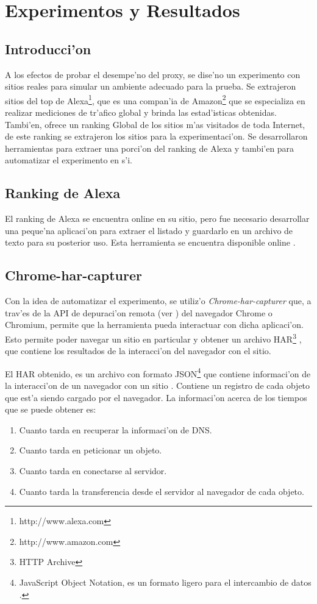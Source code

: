 \chapter{Experimentos y Resultados}
\label{experimentacion}
\section{Introducci'on}

A los efectos de probar el desempe'no del proxy, se dise'no un experimento con sitios reales para simular un ambiente adecuado para la prueba. Se extrajeron sitios del top de Alexa\footnote{http://www.alexa.com}, que es una compan'ia de Amazon\footnote{http://www.amazon.com} que se especializa en realizar mediciones de tr'afico global y brinda las estad'isticas obtenidas. Tambi'en, ofrece un ranking Global de los sitios m'as visitados de toda Internet, de este ranking se extrajeron los sitios para la experimentaci'on. Se desarrollaron herramientas para extraer una porci'on del ranking de Alexa y tambi'en para automatizar el experimento en s'i.

\section{Ranking de Alexa}
\label{rankingalexa}
El ranking de Alexa se encuentra online en su sitio, pero fue necesario desarrollar una peque'na aplicaci'on para extraer el listado y guardarlo en un archivo de texto para su posterior uso. Esta herramienta se encuentra disponible online \citep{alexatop}.

\section{Chrome-har-capturer}

Con la idea de automatizar el experimento, se utiliz'o \emph{Chrome-har-capturer} \citep{harcapturer} que, a trav'es de la API de depuraci'on remota (ver \citep{debugger}) del navegador Chrome o Chromium, permite que la herramienta pueda interactuar con dicha aplicaci'on. Esto permite  poder navegar un sitio en particular y obtener un archivo HAR\footnote{HTTP Archive} \citep{harSpec} , que contiene los resultados de la interacci'on del navegador con el sitio.

El HAR obtenido, es un archivo con formato JSON\footnote{JavaScript Object Notation, es un formato ligero para el intercambio de datos \citep{json}.} que contiene informaci'on de la interacci'on de un navegador con un sitio \citep{harSpec}. Contiene un registro de cada objeto que est'a siendo cargado por el navegador. La informaci'on acerca de los tiempos que se puede obtener es:
\begin{enumerate}
\item Cuanto tarda en recuperar la informaci'on de DNS.
\item Cuanto tarda en peticionar un objeto.
\item Cuanto tarda en conectarse al servidor.
\item Cuanto tarda la transferencia desde el servidor al navegador de cada objeto.
\end{enumerate}


